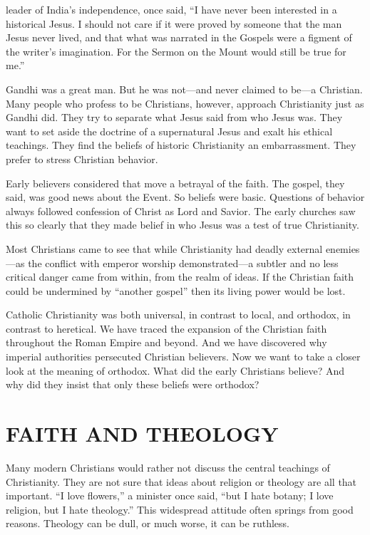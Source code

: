 
 leader of India’s independence, once said, “I have never been
interested in a historical Jesus. I should not care if it were proved by someone that the man Jesus
never lived, and that what was narrated in the Gospels were a figment of the writer’s imagination.
For the Sermon on the Mount would still be true for me.”

Gandhi was a great man. But he was not—and never claimed to be—a Christian. Many people who profess
to be Christians, however, approach Christianity just as Gandhi did. They try to separate what Jesus
said from who Jesus was. They want to set aside the doctrine of a supernatural Jesus and exalt his
ethical teachings. They find the beliefs of historic Christianity an embarrassment. They prefer to
stress Christian behavior.

Early believers considered that move a betrayal of the faith. The gospel, they said, was good news
about the Event. So beliefs were basic. Questions of behavior always followed confession of Christ
as Lord and Savior. The early churches saw this so clearly that they made belief in who Jesus was a
test of true Christianity.

Most Christians came to see that while Christianity had deadly external enemies—as the conflict with
emperor worship demonstrated—a subtler and no less critical danger came from within, from the realm
of ideas. If the Christian faith could be undermined by “another gospel” then its living power would
be lost.

Catholic Christianity was both universal, in contrast to local, and orthodox, in contrast to
heretical. We have traced the expansion of the Christian faith throughout the Roman Empire and
beyond. And we have discovered why imperial authorities persecuted Christian believers. Now we want
to take a closer look at the meaning of orthodox. What did the early Christians believe? And why did
they insist that only these beliefs were orthodox?

\section{FAITH AND THEOLOGY}

Many modern Christians would rather not discuss the central teachings of Christianity. They are not
sure that ideas about religion or theology are all that important. “I love flowers,” a minister once
said, “but I hate botany; I love religion, but I hate theology.” This widespread attitude often
springs from good reasons. Theology can be dull, or much worse, it can be ruthless.

